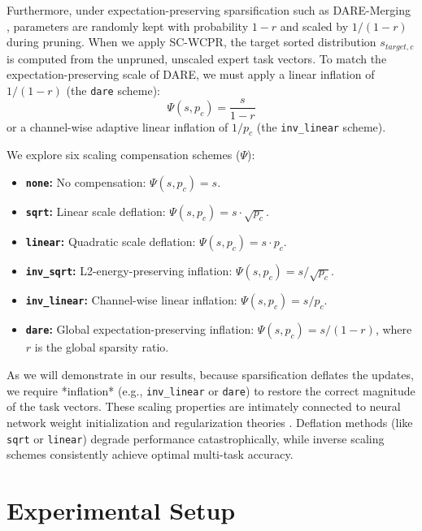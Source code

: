 \documentclass{article}
\theoremstyle{plain}
\theoremstyle{definition}
\theoremstyle{remark}
\begin{document}
Furthermore, under expectation-preserving sparsification such as DARE-Merging \cite{yu2023language}, parameters are randomly kept with probability $1-r$ and scaled by $1/(1-r)$ during pruning. When we apply SC-WCPR, the target sorted distribution $s_{target, c}$ is computed from the unpruned, unscaled expert task vectors. To match the expectation-preserving scale of DARE, we must apply a linear inflation of $1/(1-r)$ (the \texttt{dare} scheme):
\begin{equation}
    \Psi(s, p_c) = \frac{s}{1 - r}
\end{equation}
or a channel-wise adaptive linear inflation of $1/p_c$ (the \texttt{inv\_linear} scheme). 

We explore six scaling compensation schemes ($\Psi$):
\begin{itemize}
  \item \textbf{\texttt{none}:} No compensation: $\Psi(s, p_c) = s$.
  \item \textbf{\texttt{sqrt}:} Linear scale deflation: $\Psi(s, p_c) = s \cdot \sqrt{p_c}$.
  \item \textbf{\texttt{linear}:} Quadratic scale deflation: $\Psi(s, p_c) = s \cdot p_c$.
  \item \textbf{\texttt{inv\_sqrt}:} L2-energy-preserving inflation: $\Psi(s, p_c) = s / \sqrt{p_c}$.
  \item \textbf{\texttt{inv\_linear}:} Channel-wise linear inflation: $\Psi(s, p_c) = s / p_c$.
  \item \textbf{\texttt{dare}:} Global expectation-preserving inflation: $\Psi(s, p_c) = s / (1 - r)$, where $r$ is the global sparsity ratio.
\end{itemize}

As we will demonstrate in our results, because sparsification deflates the updates, we require *inflation* (e.g., \texttt{inv\_linear} or \texttt{dare}) to restore the correct magnitude of the task vectors. These scaling properties are intimately connected to neural network weight initialization and regularization theories \cite{glorot2010understanding, srivastava2014dropout, kingma2014adam}. Deflation methods (like \texttt{sqrt} or \texttt{linear}) degrade performance catastrophically, while inverse scaling schemes consistently achieve optimal multi-task accuracy.

\section{Experimental Setup}
\label{sec:setup}
\end{document}
